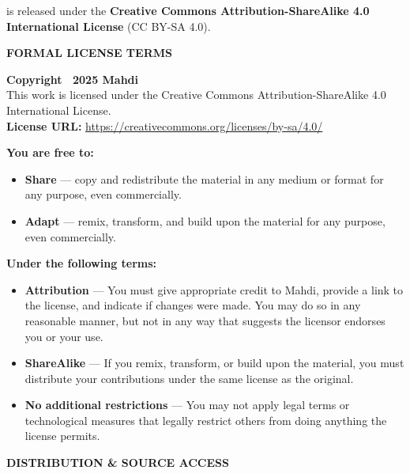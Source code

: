 \begin{flushleft}
	{\small
		\textbf{\PDFTitle} is released under the \textbf{Creative Commons Attribution-ShareAlike 4.0 International License} (CC BY-SA 4.0).
		\vspace{1.5em}
		
		\begin{center}
			\textbf{FORMAL LICENSE TERMS}
		\end{center}
		
		\textbf{Copyright \textcopyright\ 2025 Mahdi}\\
		This work is licensed under the Creative Commons Attribution-ShareAlike 4.0 International License.\\
		\textbf{License URL:} \url{https://creativecommons.org/licenses/by-sa/4.0/}
		
		\vspace{1em}
		\textbf{You are free to:}
		\begin{itemize}\itemsep2pt
			\item \textbf{Share} — copy and redistribute the material in any medium or format for any purpose, even commercially.
			\item \textbf{Adapt} — remix, transform, and build upon the material for any purpose, even commercially.
		\end{itemize}
		
		\textbf{Under the following terms:}
		\begin{itemize}\itemsep2pt
			\item \textbf{Attribution} — You must give appropriate credit to Mahdi, provide a link to the license, and indicate if changes were made. You may do so in any reasonable manner, but not in any way that suggests the licensor endorses you or your use.
			\item \textbf{ShareAlike} — If you remix, transform, or build upon the material, you must distribute your contributions under the same license as the original.
			\item \textbf{No additional restrictions} — You may not apply legal terms or technological measures that legally restrict others from doing anything the license permits.
		\end{itemize}
		
		\newpage{}
		
		\begin{center}
			\textbf{DISTRIBUTION \& SOURCE ACCESS}
		\end{center}
		
}
\end{flushleft}
